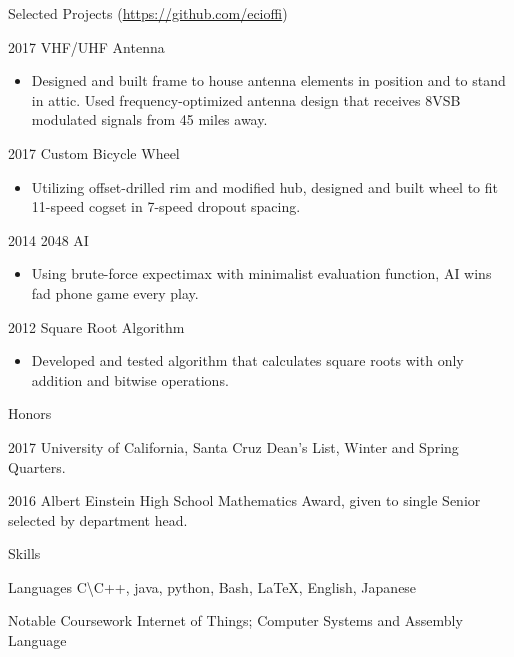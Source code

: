 \documentclass[11pt, letterpaper]{article}
\renewcommand*{\cvlabelfont}{\conds} %
\newcommand{\compactspacing}{\setlength{\itemsep}{-0.35em}} %
\newcommand{\describe}[1] {
    \begin{itemize}[label=---, topsep=-0.5em, itemindent=0em, labelsep=0.5em, leftmargin=2em]
    \small
    \item#1
    \end{itemize}
}
\begin{document}
\begin{cv}{\color{blue}{Eric A. Cioffi}}
\settowidth{\cvlabelwidth}{\cvlabelfont 2012} %
\begin{cvlist}{Selected Projects \normalfont(\url{https://github.com/ecioffi})}
    \compactspacing
    
    \item[2017] VHF/UHF Antenna
    \describe{Designed and built frame to house antenna elements in position and to stand in attic. Used frequency-optimized antenna design that receives 8VSB modulated signals from 45 miles away.}
    
    \item[2017] Custom Bicycle Wheel
    \describe{Utilizing offset-drilled rim and modified hub, designed and built wheel to fit 11-speed cogset in 7-speed dropout spacing.}
    
    \item[2014] 2048 AI
    \describe{Using brute-force expectimax with minimalist evaluation function, AI wins fad phone game every play.}
    
    \item[2012] Square Root Algorithm
    \describe{Developed and tested algorithm that calculates square roots with only addition and bitwise operations.}
\end{cvlist}
\renewcommand*{\cvlistheadingfont}{\large\bfseries}

\begin{cvlist}{Honors}
    \compactspacing
    
    \item[2017] University of California, Santa Cruz Dean's List, Winter and Spring Quarters.
    \item[2016] Albert Einstein High School Mathematics Award, given to single Senior selected by department head.
\end{cvlist}

\setlength{\cvlabelsep}{2em}
\settowidth{\cvlabelwidth}{\cvlabelfont Independent Learning} %
\begin{cvlist}{Skills}
    \compactspacing
    
    \item[Languages] C\textbackslash C++, java, python, Bash, \LaTeX, English, Japanese
    \item[Notable Coursework] Internet of Things; Computer Systems and Assembly Language
    

\end{cvlist}
\end{cv}
\end{document}
